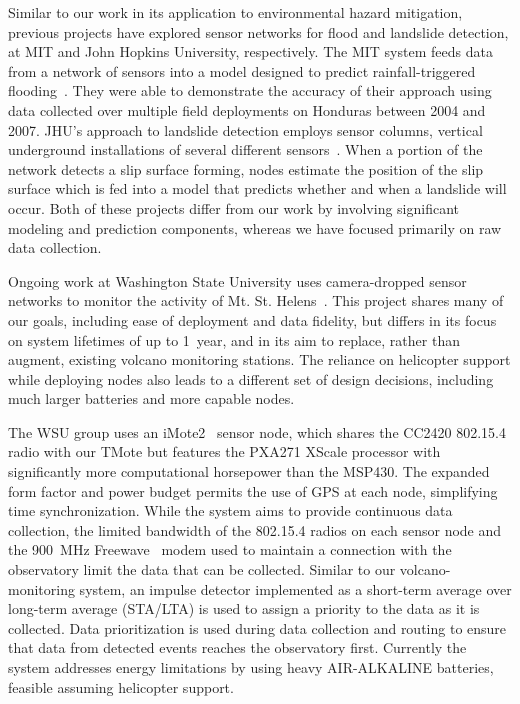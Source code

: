 Similar to our work in its application to environmental hazard mitigation,
previous projects have explored sensor networks for flood and landslide
detection, at MIT and John Hopkins University, respectively. The MIT system
feeds data from a network of sensors into a model designed to predict
rainfall-triggered flooding~\cite{basha-sensys08}. They were able to
demonstrate the accuracy of their approach using data collected over multiple
field deployments on Honduras between 2004 and 2007. JHU's approach to
landslide detection employs sensor columns, vertical underground
installations of several different sensors~\cite{landslide-sensys05}. When a
portion of the network detects a slip surface forming, nodes estimate the
position of the slip surface which is fed into a model that predicts whether
and when a landslide will occur. Both of these projects differ from our work
by involving significant modeling and prediction components, whereas we have
focused primarily on raw data collection.

Ongoing work at Washington State University uses camera-dropped sensor
networks to monitor the activity of Mt. St.
Helens~\cite{wsuvolcano-mobisys09}. This project shares many of our goals,
including ease of deployment and data fidelity, but differs in its focus on
system lifetimes of up to 1~year, and in its aim to replace, rather than
augment, existing volcano monitoring stations. The reliance on helicopter
support while deploying nodes also leads to a different set of design
decisions, including much larger batteries and more capable nodes.

The WSU group uses an iMote2~\cite{imote2} sensor node, which shares the
CC2420 802.15.4 radio with our TMote but features the PXA271 XScale processor
with significantly more computational horsepower than the MSP430. The
expanded form factor and power budget permits the use of GPS at each node,
simplifying time synchronization. While the system aims to provide continuous
data collection, the limited bandwidth of the 802.15.4 radios on each sensor
node and the 900~MHz Freewave~\cite{freewave} modem used to maintain a
connection with the observatory limit the data that can be collected. Similar
to our volcano-monitoring system, an impulse detector implemented as a
short-term average over long-term average (STA/LTA) is used to assign a
priority to the data as it is collected. Data prioritization is used during
data collection and routing to ensure that data from detected events reaches
the observatory first. Currently the system addresses energy limitations by
using heavy AIR-ALKALINE batteries, feasible assuming helicopter support.

